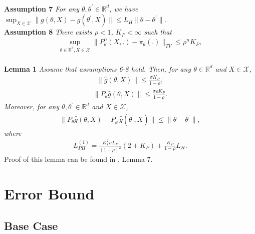 \documentclass[a4paper]{article}
\newcommand{\norm}[1]{\|#1 \|}
\newcommand{\constLPH}[1]{L_{PH}^{(#1)}}
\begin{document}
\\
\textbf{Assumption 7} \textit{
	For any $\theta, \theta^{\prime} \in \mathbb{R}^{d}$, we have $\sup_{X \in \mathcal{X}}\norm{g\left(\theta, X\right) - g\left(\theta^{\prime}, X\right)} \le L_{H}\norm{\theta - \theta^{\prime}}$.
}
\\
\textbf{Assumption 8} \textit{
	There exists $\rho < 1$, $K_{P} < \infty$ such that
	\begin{align*}
		\sup_{\theta \in \mathbb{R}^{d}, X \in \mathcal{X}} \norm{P_{\theta}^{n}\left(X, .\right) - \pi_{\theta}(.)}_{TV} \le \rho^{n}K_{P},
	\end{align*}
}
\\
\textbf{Lemma 1} \textit{
	Assume that assumptions 6-8 hold. Then, for any $\theta \in \mathbb{R}^{d}$ and $X \in \mathcal{X}$,
	\begin{align*}
		\norm{\hat{g}\left(\theta, X\right)} \le \frac{\sigma K_{P}}{1 - \rho},
	\end{align*}
	\begin{align*}
		\norm{P_{\theta}\hat{g}\left(\theta, X\right)} \le \frac{\sigma \rho K_{P}}{1 - \rho}.
	\end{align*}
	Moreover, for any $\theta, \theta^{\prime} \in \mathbb{R}^{d}$ and $X \in \mathcal{X}$,
	\begin{align*}
		\norm{P_{\theta}\hat{g}\left(\theta, X\right) - P_{\theta^{\prime}}\hat{g}\left(\theta^{\prime}, X\right)} \le \norm{\theta - \theta^{\prime}},
	\end{align*}
	where
	\begin{align*}
		\constLPH{1} = \frac{K_{P}^{2}\sigma L_{P}}{(1 - \rho)^{2}}\left(2 + K_{P}\right) + \frac{K_{P}}{1 - \rho}L_{H}.
	\end{align*}
}
Proof of this lemma can be found in \cite{karimi2019non}, Lemma 7.
\section{Error Bound}


\subsection{Base Case}
\end{document}
